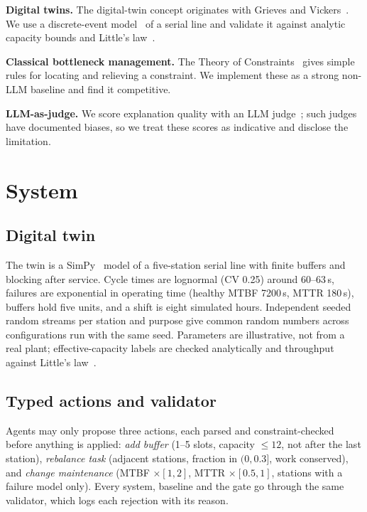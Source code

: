 \documentclass[conference]{IEEEtran}
\begin{document}
\textbf{Digital twins.} The digital-twin concept originates with Grieves and
Vickers~\cite{grieves2017}. We use a discrete-event model~\cite{simpy} of a serial line and validate it
against analytic capacity bounds and Little's law~\cite{little1961}.

\textbf{Classical bottleneck management.} The Theory of Constraints~\cite{goldratt1984} gives simple rules
for locating and relieving a constraint. We implement these as a strong non-LLM baseline and find it
competitive.

\textbf{LLM-as-judge.} We score explanation quality with an LLM judge~\cite{zheng2023judge}; such judges have
documented biases, so we treat these scores as indicative and disclose the limitation.

\section{System}
\subsection{Digital twin}
The twin is a SimPy~\cite{simpy} model of a five-station serial line with finite buffers and blocking after
service. Cycle times are lognormal (CV 0.25) around 60--63\,s, failures are exponential in operating time
(healthy MTBF 7200\,s, MTTR 180\,s), buffers hold five units, and a shift is eight simulated hours.
Independent seeded random streams per station and purpose give common random numbers across configurations
run with the same seed. Parameters are illustrative, not from a real plant; effective-capacity labels are
checked analytically and throughput against Little's law~\cite{little1961}.

\subsection{Typed actions and validator}
Agents may only propose three actions, each parsed and constraint-checked before anything is applied:
\emph{add buffer} (1--5 slots, capacity $\le 12$, not after the last station), \emph{rebalance task}
(adjacent stations, fraction in $(0, 0.3]$, work conserved), and \emph{change maintenance} (MTBF $\times
[1,2]$, MTTR $\times [0.5,1]$, stations with a failure model only). Every system, baseline and the gate go
through the same validator, which logs each rejection with its reason.
\end{document}
